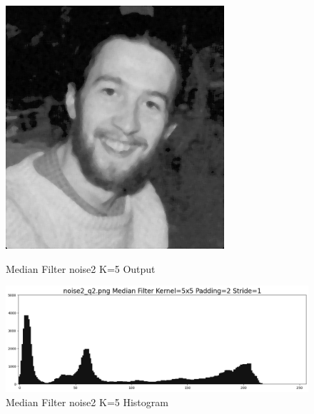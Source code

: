 \documentclass[12pt,a4paper]{report}
\begin{document}
\begin{figure}[!htb]
  \includegraphics[width=1\linewidth]{output/noise2_q2_K5P2.png}
  \caption{Median Filter noise2 K=5 Output}
  \includegraphics[width=1\linewidth]{output/noise2_q2_K5P2_his.png}
  \caption{Median Filter noise2 K=5 Histogram}
\end{figure}
\end{document}
